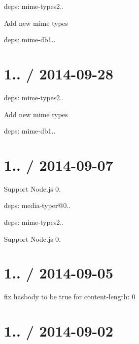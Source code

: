 \begin{DoxyItemize}
\item deps\+: mime-\/types2..
\begin{DoxyItemize}
\item Add new mime types
\item deps\+: mime-\/db1..
\end{DoxyItemize}
\end{DoxyItemize}

\section*{1.. / 2014-\/09-\/28 }


\begin{DoxyItemize}
\item deps\+: mime-\/types2..
\begin{DoxyItemize}
\item Add new mime types
\item deps\+: mime-\/db1..
\end{DoxyItemize}
\end{DoxyItemize}

\section*{1.. / 2014-\/09-\/07 }


\begin{DoxyItemize}
\item Support Node.\+js 0.
\item deps\+: media-\/typer@0..
\item deps\+: mime-\/types2..
\begin{DoxyItemize}
\item Support Node.\+js 0.
\end{DoxyItemize}
\end{DoxyItemize}

\section*{1.. / 2014-\/09-\/05 }


\begin{DoxyItemize}
\item fix {\ttfamily hasbody} to be true for {\ttfamily content-\/length\+: 0}
\end{DoxyItemize}

\section*{1.. / 2014-\/09-\/02 }


